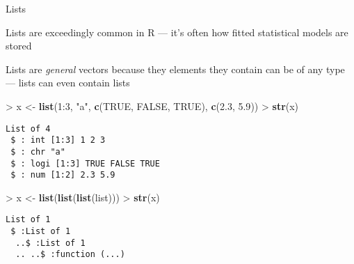 \documentclass[10pt,ignorenonframetext,compress, aspectratio=169]{beamer}
\newenvironment{Shaded}{\begin{snugshade}}{\end{snugshade}}
\newcommand{\KeywordTok}[1]{\textcolor[rgb]{0.13,0.29,0.53}{\textbf{{#1}}}}
\newcommand{\DecValTok}[1]{\textcolor[rgb]{0.00,0.00,0.81}{{#1}}}
\newcommand{\FloatTok}[1]{\textcolor[rgb]{0.00,0.00,0.81}{{#1}}}
\newcommand{\StringTok}[1]{\textcolor[rgb]{0.31,0.60,0.02}{{#1}}}
\newcommand{\OtherTok}[1]{\textcolor[rgb]{0.56,0.35,0.01}{{#1}}}
\newcommand{\NormalTok}[1]{{#1}}
\begin{document}
\begin{frame}[fragile]{Lists}

Lists are exceedingly common in R --- it's often how fitted statistical
models are stored

Lists are \emph{general} vectors because they elements they contain can
be of any type --- lists can even contain lists

\begin{Shaded}
\begin{Highlighting}[]
\NormalTok{>}\StringTok{ }\NormalTok{x <-}\StringTok{ }\KeywordTok{list}\NormalTok{(}\DecValTok{1}\NormalTok{:}\DecValTok{3}\NormalTok{, }\StringTok{"a"}\NormalTok{, }\KeywordTok{c}\NormalTok{(}\OtherTok{TRUE}\NormalTok{, }\OtherTok{FALSE}\NormalTok{, }\OtherTok{TRUE}\NormalTok{), }\KeywordTok{c}\NormalTok{(}\FloatTok{2.3}\NormalTok{, }\FloatTok{5.9}\NormalTok{))}
\NormalTok{>}\StringTok{ }\KeywordTok{str}\NormalTok{(x)}
\end{Highlighting}
\end{Shaded}

\begin{verbatim}
List of 4
 $ : int [1:3] 1 2 3
 $ : chr "a"
 $ : logi [1:3] TRUE FALSE TRUE
 $ : num [1:2] 2.3 5.9
\end{verbatim}

\begin{Shaded}
\begin{Highlighting}[]
\NormalTok{>}\StringTok{ }\NormalTok{x <-}\StringTok{ }\KeywordTok{list}\NormalTok{(}\KeywordTok{list}\NormalTok{(}\KeywordTok{list}\NormalTok{(list)))}
\NormalTok{>}\StringTok{ }\KeywordTok{str}\NormalTok{(x)}
\end{Highlighting}
\end{Shaded}

\begin{verbatim}
List of 1
 $ :List of 1
  ..$ :List of 1
  .. ..$ :function (...)  
\end{verbatim}

\end{frame}
\end{document}
